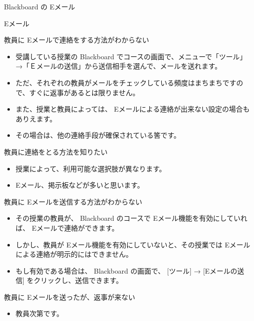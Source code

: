 \documentclass[a4j,10pt]{jsarticle}
\begin{document}
{\newpage\clearpage
{}%
\begin{frame}[label={sec:org1d63f5a},fragile]{Blackboard の Eメール}
\begin{block}{Eメール}
\begin{block}{教員に Eメールで連絡をする方法がわからない}
\begin{itemize}
\item 受講している授業の Blackboard でコースの画面で、メニューで「ツール」→「Ｅメールの送信」から送信相手を選んで、メールを送れます。
\item ただ、それぞれの教員がメールをチェックしている頻度はまちまちですので、すぐに返事があるとは限りません。
\item また、授業と教員によっては、 Eメールによる連絡が出来ない設定の場合もありえます。
\item その場合は、他の連絡手段が確保されている筈です。
\end{itemize}
\end{block}
\par
\begin{block}{教員に連絡をとる方法を知りたい}
\begin{itemize}
\item 授業によって、利用可能な選択肢が異なります。
\item Eメール、掲示板などが多いと思います。
\end{itemize}
\end{block}
\par
\begin{block}{教員に Eメールを送信する方法がわからない}
\begin{itemize}
\item その授業の教員が、 Blackboard のコースで Eメール機能を有効にしていれば、 Eメールで連絡ができます。
\item しかし、教員が Eメール機能を有効にしていないと、その授業では Eメールによる連絡が明示的にはできません。
\item もし有効である場合は、 Blackboard の画面で、 [ツール] → [Eメールの送信] をクリックし、送信できます。
\end{itemize}
\end{block}
\par
\begin{block}{教員に Eメールを送ったが、返事が来ない}
\begin{itemize}
\item 教員次第です。
\end{itemize}
\end{block}
\par

\end{block}
\end{frame}}
\end{document}
